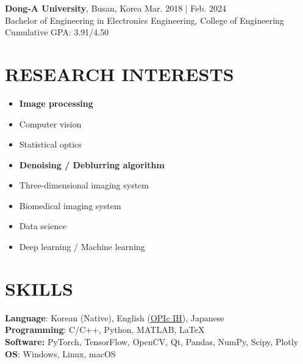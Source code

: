 \documentclass[a4paper,9pt]{extarticle}
\begin{document}
\noindent
\textbf{Dong-A University}, Busan, Korea \hfill Mar. 2018 | Feb. 2024\\ %
Bachelor of Engineering in Electronics Engineering, College of Engineering \hfill Cumulative GPA: 3.91/4.50 \\ %

\section*{RESEARCH INTERESTS}
\begin{itemize}
    \item \textbf{Image processing}
    \item Computer vision
    \item Statistical optics
    \item \textbf{Denoising / Deblurring algorithm}
    \item Three-dimensional imaging system
    \item Biomedical imaging system
    \item Data science
    \item Deep learning / Machine learning
\end{itemize} 

\section*{SKILLS}
\textbf{Language}: Korean (Native), English (\href{https://github.com/user-attachments/assets/f578b432-f7a8-410e-851c-852e9ae55378}{OPIc IH}), Japanese \\ 
\textbf{Programming}: C/C++, Python, MATLAB, LaTeX  \\
\textbf{Software:} PyTorch, TensorFlow, OpenCV, Qt, Pandas, NumPy, Scipy, Plotly \\
\textbf{OS}: Windows, Linux, macOS \\


\end{document}
